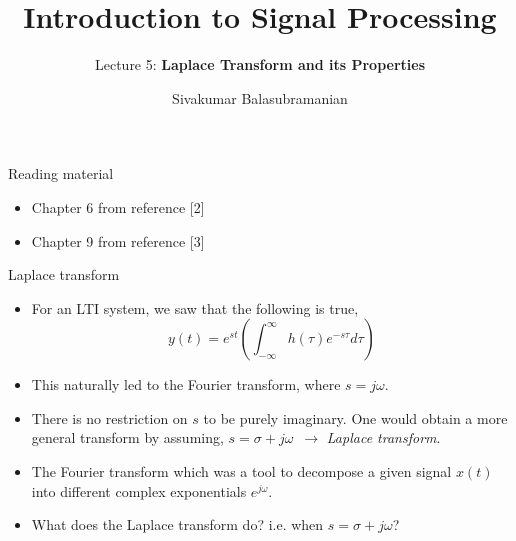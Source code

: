 \documentclass{beamer}
\title{Introduction to Signal Processing}
\subtitle{Lecture 5: \textbf{Laplace Transform and its Properties}}
\author{Sivakumar Balasubramanian}
\institute[Christian Medical College] %
{
  \inst{}%
  Department of Bioengineering\\
  Christian Medical College, Bagayam\\
  Vellore 632002
}
\date{}
\begin{document}
\begin{frame}
  \titlepage
\end{frame}

\begin{frame}{Reading material}

\begin{itemize}
\item Chapter 6 from reference [2]
\item Chapter 9 from reference [3]
\end{itemize}

\end{frame}


\begin{frame}{Laplace transform}

\begin{itemize}
\item For an LTI system, we saw that the following is true,
\[ y(t) = e^{st}\left(\int_{-\infty}^{\infty}h(\tau)e^{-s\tau}d\tau\right) \]
\item This naturally led to the Fourier transform, where $s = j\omega$.
\item There is no restriction on $s$ to be purely imaginary. One would obtain a more general transform by assuming, $s=\sigma  + j\omega \,\,\, \longrightarrow$ \textit{Laplace transform}.
\item The Fourier transform which was a tool to decompose a given signal $x(t)$ into different complex exponentials $e^{j\omega}$. 
\item What does the Laplace transform do? i.e. when $s=\sigma + j\omega$?
\end{itemize}
\end{frame}
\end{document}
